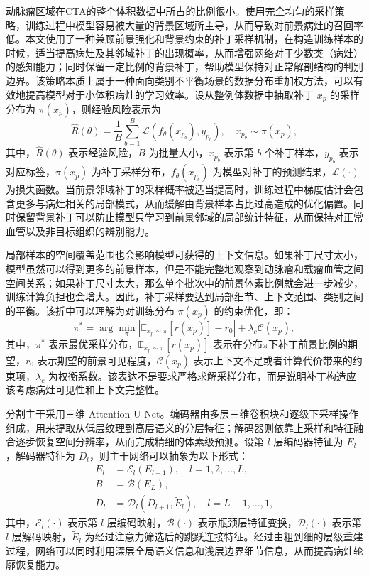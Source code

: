 动脉瘤区域在CTA的整个体积数据中所占的比例很小。使用完全均匀的采样策略，训练过程中模型容易被大量的背景区域所主导，从而导致对前景病灶的召回率低。本文使用了一种兼顾前景强化和背景约束的补丁采样机制，在构造训练样本的时候，适当提高病灶及其邻域补丁的出现概率，从而增强网络对于少数类（病灶）的感知能力；同时保留一定比例的背景补丁，帮助模型保持对正常解剖结构的判别边界。该策略本质上属于一种面向类别不平衡场景的数据分布重加权方法，可以有效地提高模型对于小体积病灶的学习效率。设从整例体数据中抽取补丁 $x_p$ 的采样分布为 $\pi(x_p)$，则经验风险表示为
\begin{equation}
\widehat{R}(\theta)=\frac{1}{B}\sum_{b=1}^{B}\mathcal{L}\left(f_{\theta}(x_{p_b}),y_{p_b}\right),\quad x_{p_b}\sim\pi(x_p),
\label{eq:patch-risk}
\end{equation}
其中，$\widehat{R}(\theta)$ 表示经验风险，$B$ 为批量大小，$x_{p_b}$ 表示第 $b$ 个补丁样本，$y_{p_b}$ 表示对应标签，$\pi(x_p)$ 为补丁采样分布，$f_{\theta}(x_{p_b})$ 为模型对补丁的预测结果，$\mathcal{L}(\cdot)$ 为损失函数。当前景邻域补丁的采样概率被适当提高时，训练过程中梯度估计会包含更多与病灶相关的局部模式，从而缓解由背景样本占比过高造成的优化偏置。同时保留背景补丁可以防止模型只学习到前景邻域的局部统计特征，从而保持对正常血管以及非目标组织的辨别能力。

局部样本的空间覆盖范围也会影响模型可获得的上下文信息。如果补丁尺寸太小，模型虽然可以得到更多的前景样本，但是不能完整地观察到动脉瘤和载瘤血管之间空间关系；如果补丁尺寸太大，那么单个批次中的前景体素比例就会进一步减少，训练计算负担也会增大。因此，补丁采样要达到局部细节、上下文范围、类别之间的平衡。该折中可以理解为对训练分布 $\pi(x_p)$ 的约束优化，即：
\begin{equation}
\pi^{\ast}=\arg\min_{\pi}\left|\mathbb{E}_{x_p\sim\pi}[r(x_p)]-r_0\right|+\lambda_c\mathcal{C}(x_p),
\label{eq:patch-policy}
\end{equation}
其中，$\pi^{\ast}$ 表示最优采样分布，$\mathbb{E}_{x_p\sim\pi}[r(x_p)]$ 表示在分布$\pi$下补丁前景比例的期望，$r_0$ 表示期望的前景可见程度，$\mathcal{C}(x_p)$ 表示上下文不足或者计算代价带来的约束项，$\lambda_c$ 为权衡系数。该表达不是要求严格求解采样分布，而是说明补丁构造应该考虑病灶可见性和上下文完整性。

分割主干采用三维 Attention U-Net。编码器由多层三维卷积块和逐级下采样操作组成，用来提取从低层纹理到高层语义的分层特征；解码器则依靠上采样和特征融合逐步恢复空间分辨率，从而完成精细的体素级预测。设第 $l$ 层编码器特征为 $E_l$，解码器特征为 $D_l$，则主干网络可以抽象为以下形式：
\begin{equation}
\begin{aligned}
E_l &= \mathcal{E}_l(E_{l-1}), \quad l=1,2,\ldots,L,\\
B &= \mathcal{B}(E_L),\\
D_l &= \mathcal{D}_l(D_{l+1},\widetilde{E}_l), \quad l=L-1,\ldots,1,
\end{aligned}
\label{eq:unet-main}
\end{equation}
其中，$\mathcal{E}_l(\cdot)$ 表示第 $l$ 层编码映射，$\mathcal{B}(\cdot)$ 表示瓶颈层特征变换，$\mathcal{D}_l(\cdot)$ 表示第 $l$ 层解码映射，$\widetilde{E}_l$ 为经过注意力筛选后的跳跃连接特征。经过由粗到细的层级重建过程，网络可以同时利用深层全局语义信息和浅层边界细节信息，从而提高病灶轮廓恢复能力。

